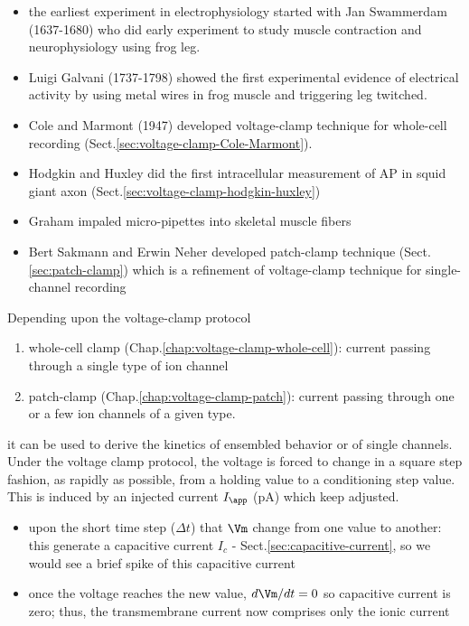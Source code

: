 \begin{itemize}
  \item the earliest experiment in electrophysiology started with Jan Swammerdam
  (1637-1680) who did early experiment to study muscle contraction and
  neurophysiology using frog leg.

  \item Luigi Galvani (1737-1798) showed the first experimental evidence of
  electrical activity by using metal wires in frog muscle and triggering leg
  twitched.

  \item Cole and Marmont (1947) developed voltage-clamp technique
  for whole-cell recording (Sect.\ref{sec:voltage-clamp-Cole-Marmont}).

  \item Hodgkin and Huxley did the first intracellular measurement of AP in
  squid giant axon (Sect.\ref{sec:voltage-clamp-hodgkin-huxley})

  \item Graham impaled micro-pipettes into skeletal muscle fibers

  \item Bert Sakmann and Erwin Neher developed patch-clamp technique
  (Sect.\ref{sec:patch-clamp}) which is a refinement of voltage-clamp technique
  for single-channel recording
\end{itemize}


Depending upon the voltage-clamp protocol
\begin{enumerate}
  \item whole-cell clamp (Chap.\ref{chap:voltage-clamp-whole-cell}): current
  passing through a single type of ion channel

  \item patch-clamp (Chap.\ref{chap:voltage-clamp-patch}):  current passing
  through one or a few ion channels of a given type.
\end{enumerate}
it can be used to derive the kinetics of ensembled behavior or of single
channels. Under the voltage clamp protocol, the voltage is forced to change in
a square step fashion, as rapidly as possible, from a holding value to a
conditioning step value. This is induced by an injected current $I_\app$ (pA)
which keep adjusted.
\begin{itemize}
  \item upon the short time step ($\Delta t$) that $\Vm$ change from one value
  to another: this generate a capacitive current $I_c$ -
  Sect.\ref{sec:capacitive-current}, so we would see a brief spike of this
  capacitive current

  \item once the voltage reaches the new value, $d\Vm/dt=0$ so capacitive
  current is zero; thus, the transmembrane current now comprises only the ionic
  current

\end{itemize}


